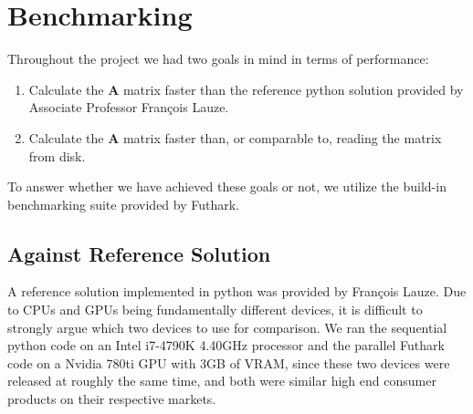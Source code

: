 \section{Benchmarking}
Throughout the project we had two goals in mind in terms of performance:
\begin{enumerate}
    \item Calculate the $\mathbf{A}$ matrix faster than the reference python solution provided 
    by Associate Professor François Lauze.
    \item Calculate the $\mathbf{A}$ matrix faster than, or comparable to, reading the matrix from disk.
\end{enumerate}
To answer whether we have achieved these goals or not, we utilize the build-in 
benchmarking suite provided by Futhark. 

\subsection{Against Reference Solution}
A reference solution implemented in python was provided by François Lauze. 
Due to CPUs and GPUs being fundamentally different devices, it is difficult to strongly argue which two devices to use for comparison. We ran the sequential python code on an Intel i7-4790K 4.40GHz processor and the parallel Futhark code on a Nvidia 780ti GPU with 3GB of VRAM, since these two devices were released at roughly the same time, and both were similar high end consumer products on their respective markets.

